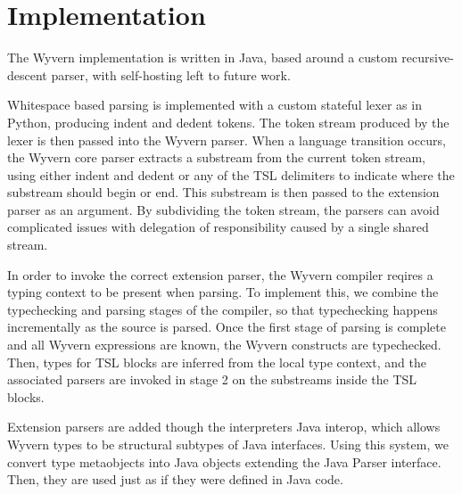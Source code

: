
\section{Implementation}
\label{s:implementation}
The Wyvern implementation is written in Java, based around a custom recursive-descent parser, with self-hosting left to future work.

Whitespace based parsing is implemented with a custom stateful lexer as in Python, producing indent and dedent tokens. The token stream produced by the lexer is then passed into the Wyvern parser. When a language transition occurs, the Wyvern core parser extracts a substream from the current token stream, using either indent and dedent or any of the TSL delimiters to indicate where the substream should begin or end. This substream is then passed to the extension parser as an argument. By subdividing the token stream, the parsers can avoid complicated issues with delegation of responsibility caused by a single shared stream. 

In order to invoke the correct extension parser, the Wyvern compiler reqires a typing context to be present when parsing. To implement this, we combine the typechecking and parsing stages of the compiler, so that typechecking happens incrementally as the source is parsed. Once the first stage of parsing is complete and all Wyvern expressions are known, the Wyvern constructs are typechecked. Then, types for TSL blocks are inferred from the local type context, and the associated parsers are invoked in stage 2 on the substreams inside the TSL blocks.

Extension parsers are added though the interpreters Java interop, which allows Wyvern types to be structural subtypes of Java interfaces. Using this system, we convert type metaobjects into Java objects extending the Java Parser interface. Then, they are used just as if they were defined in Java code.
